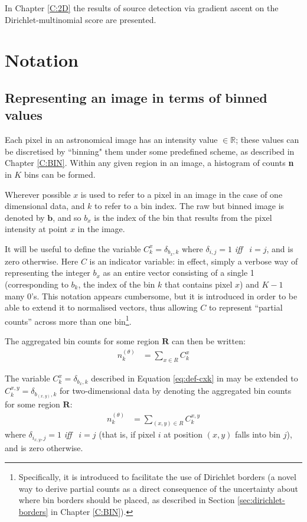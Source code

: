 In Chapter \ref{C:2D} the results of source detection via gradient ascent on the Dirichlet-multinomial score are presented.

\section{Notation}

\subsection{Representing an image in terms of binned values}

Each pixel in an astronomical image has an intensity value $\in \mathbb{R}$; these values can be discretised by ``binning" them under some predefined scheme, as described in Chapter \ref{C:BIN}. Within any given region in an image, a histogram of counts \textbf{n} in $K$ bins can be formed. 

Wherever possible $x$ is used to refer to a pixel in an image in the case of one dimensional data, and $k$ to refer to a bin index.  The raw but binned image is denoted by $\mathbf{b}$, and so $b_x$ is the index of the bin that results from the pixel intensity at point $x$ in the image.

It will be useful to define the variable $C^x_k =\delta_{b_x,k}$ where
$\delta_{i,j}=1$ {\it iff} \, $i=j$, and is zero otherwise. Here $C$
is an indicator variable: in effect, simply a verbose way of
representing the integer $b_x$ as an entire vector consisting of a single 1 (corresponding to $b_k$, the index of the bin $k$ that contains pixel $x$) and $K-1$ many 0's. This notation appears cumbersome, but it is introduced in order to be able to extend it to normalised vectors, thus allowing $C$ to represent ``partial counts'' across more than one bin\footnote{Specifically, it is introduced to facilitate the use of Dirichlet borders (a novel way to derive partial counts as a direct consequence of the uncertainty about where bin borders should be placed, as described in Section \ref{sec:dirichlet-borders} in Chapter \ref{C:BIN}).}.

The aggregated bin counts for some region $\mathbf{R}$ can then be written:
\begin{align}
n_k^{(\theta)} &= \sum_{x \in R} C^x_k \label{eq:def-cxk}
\end{align}

The variable $C^x_k =\delta_{b_x,k}$ described in Equation \ref{eq:def-cxk} in may be extended to $C^{x,y}_k =\delta_{b_{(x,y)},k}$ for two-dimensional data by denoting the aggregated bin counts for some region $\mathbf{R}$:
\begin{align}
n_k^{(\theta)} &= \sum_{(x,y) \in R} C^{x,y}_k
\end{align}
where $\delta_{i_{x,y},j}=1$ {\it iff} \, $i=j$ (that is, if pixel $i$ at position $(x,y)$ falls into bin $j$), and is zero otherwise.

